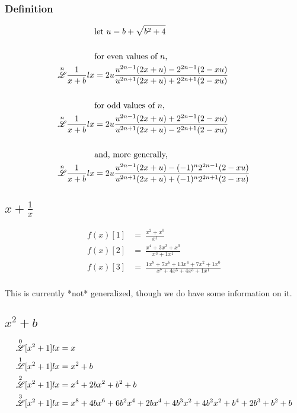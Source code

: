 \documentclass[12pt, letterpaper]{article}
\begin{document}
\subsubsection{Definition}
\begin{equation}
    \begin{split}
        &\text{let } u = b+\sqrt{b^2+4}\\
        \\
        &\text{for even values of }n\text{,}\\
        \overset{n}{\mathscr{L}}\frac{1}{x+b}lx & = 2u\frac{u^{2n-1}(2x+u)-2^{2n-1}(2-xu)}{u^{2n+1}(2x+u)+2^{2n+1}(2-xu)}\\
        \\
        &\text{for odd values of }n\text{,}\\
        \overset{n}{\mathscr{L}}\frac{1}{x+b}lx & = 2u\frac{u^{2n-1}(2x+u)+2^{2n-1}(2-xu)}{u^{2n+1}(2x+u)-2^{2n+1}(2-xu)}\\
        \\
        &\text{and, more generally,}\\
        \overset{n}{\mathscr{L}}\frac{1}{x+b}lx & = 2u\frac{u^{2n-1}(2x+u)-(-1)^n2^{2n-1}(2-xu)}{u^{2n+1}(2x+u)+(-1)^n2^{2n+1}(2-xu)}\\
    \end{split}
\end{equation}

\subsection{$x + \frac{1}{x}$}
\begin{equation}
    \begin{split}
        f(x)[1] & = \  \frac{x^2+x^{0}}{x^{1}}\\
        f(x)[2] & = \  \frac{x^{4} + 3 x^{2} + x^{0}}{x^{3} + 1x^{1}}\\
        f(x)[3] & = \  \frac{1x^{8}+7x^{6}+13x^{4}+7x^{2}+1x^{0}}{x^{7}+4x^{5}+4x^{3}+ 1x^{1}}\\
    \end{split}
\end{equation}

This is currently *not* generalized, though we do have some information on it.

\subsection{$x^2+b$}
\begin{align}
        \overset{0}{\mathscr{L}}[x^2+1]lx & = x\\
        \overset{1}{\mathscr{L}}[x^2+1]lx & = x^2+b\\
        \overset{2}{\mathscr{L}}[x^2+1]lx & = x^4+2bx^2+b^2+b\\
        \overset{3}{\mathscr{L}}[x^2+1]lx & = x^8+4bx^6+6b^2x^4+2bx^4+4b^3x^2+4b^2x^2+b^4+2b^3+b^2+b\\
\end{align}
\end{document}

